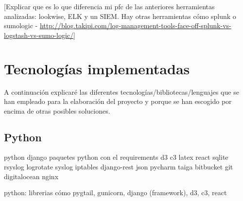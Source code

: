 [Explicar que es lo que diferencia mi pfc de las anteriores herramientas analizadas: lookwise, ELK y un SIEM. Hay otras herramientas cómo splunk o sumologic - \url{http://blog.takipi.com/log-management-tools-face-off-splunk-vs-logstash-vs-sumo-logic/}]

\section{Tecnologías implementadas}

A continuación explicaré las diferentes tecnologías/bibliotecas/lenguajes que se han empleado para la elaboración del proyecto y porque se han escogido por encima de otras posibles soluciones.

\subsection{Python}




python
django
paquetes python con el requirements
d3
c3
latex
react
sqlite
rsyslog
logrotate
syslog
iptables
django-rest
json
pycharm
taiga
bitbucket
git
digitalocean
nginx


python: librerias cómo pygtail, gunicorn, django (framework), d3, c3, react
